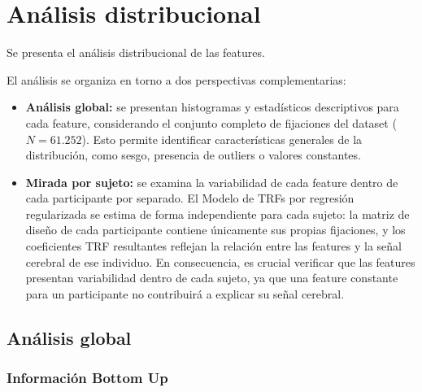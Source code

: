 \section{Análisis distribucional}
\label{sec:analisis_distribucional}

%
%
%

Se presenta el análisis distribucional de las features.

El análisis se organiza en torno a dos perspectivas complementarias:
\begin{itemize}
    \item \textbf{Análisis global:} se presentan histogramas y estadísticos descriptivos para cada feature, considerando el conjunto completo de fijaciones del dataset ($N = 61.252$). Esto permite identificar características generales de la distribución, como sesgo, presencia de outliers o valores constantes.
    
    \item \textbf{Mirada por sujeto:} se examina la variabilidad de cada feature dentro de cada participante por separado. El Modelo de TRFs por regresión regularizada se estima de forma independiente para cada sujeto: la matriz de diseño de cada participante contiene únicamente sus propias fijaciones, y los coeficientes TRF resultantes reflejan la relación entre las features y la señal cerebral de ese individuo. En consecuencia, es crucial verificar que las features presentan variabilidad dentro de cada sujeto, ya que una feature constante para un participante no contribuirá a explicar su señal cerebral.
\end{itemize}


\subsection{Análisis global}
\subsubsection{Información Bottom Up}

